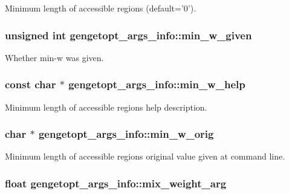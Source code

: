 Minimum length of accessible regions (default='0'). 

\hypertarget{structgengetopt__args__info_aeb19a366901b0fa59385722ed8c69747}{
\subsubsection[{min\+\_\+w\+\_\+given}]{\setlength{\rightskip}{0pt plus 5cm}unsigned int gengetopt\+\_\+args\+\_\+info\+::min\+\_\+w\+\_\+given}}\label{structgengetopt__args__info_aeb19a366901b0fa59385722ed8c69747}


Whether min-\/w was given. 

\hypertarget{structgengetopt__args__info_aaf033ec8b1593d0f2f6f6d28a9709622}{
\subsubsection[{min\+\_\+w\+\_\+help}]{\setlength{\rightskip}{0pt plus 5cm}const char $\ast$ gengetopt\+\_\+args\+\_\+info\+::min\+\_\+w\+\_\+help}}\label{structgengetopt__args__info_aaf033ec8b1593d0f2f6f6d28a9709622}


Minimum length of accessible regions help description. 

\hypertarget{structgengetopt__args__info_a65ff1a2d7368adda94e83864d5d8c399}{
\subsubsection[{min\+\_\+w\+\_\+orig}]{\setlength{\rightskip}{0pt plus 5cm}char $\ast$ gengetopt\+\_\+args\+\_\+info\+::min\+\_\+w\+\_\+orig}}\label{structgengetopt__args__info_a65ff1a2d7368adda94e83864d5d8c399}


Minimum length of accessible regions original value given at command line. 

\hypertarget{structgengetopt__args__info_a5453c7d90806e2c130485e8d45e4b2bb}{
\subsubsection[{mix\+\_\+weight\+\_\+arg}]{\setlength{\rightskip}{0pt plus 5cm}float gengetopt\+\_\+args\+\_\+info\+::mix\+\_\+weight\+\_\+arg}}\label{structgengetopt__args__info_a5453c7d90806e2c130485e8d45e4b2bb}


